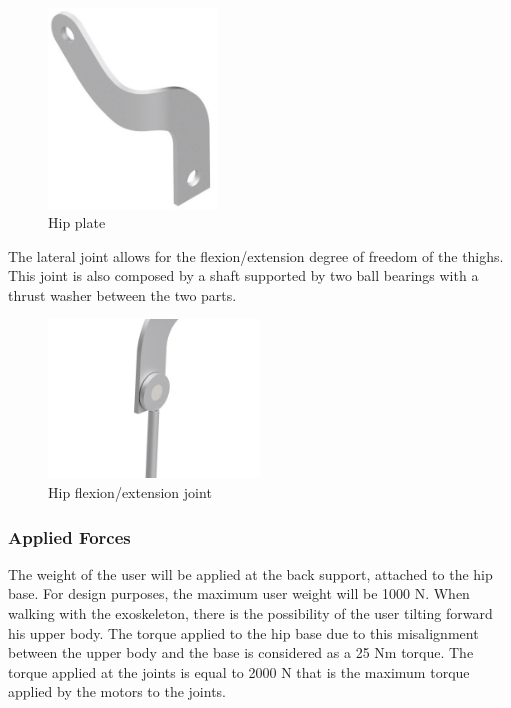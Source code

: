 \begin{figure}[thpb]
      \centering
      \includegraphics[width=0.4\textwidth]{Images/Chapa_quadril.jpg}
      \caption{Hip plate}
      \label{Chapa Quadril}
   \end{figure}
   
   The lateral joint allows for the flexion/extension degree of freedom of the thighs. This joint is also composed by a shaft supported by two ball bearings with a thrust washer between the two parts.
   
   \begin{figure}[thpb]
      \centering
      \includegraphics[width=0.5\textwidth]{Images/Junta_Quadril_2.jpg}
      \caption{Hip flexion/extension joint}
      \label{Junta Quadril 2}
   \end{figure}
   
   \subsubsection{Applied Forces}
   
   The weight of the user will be applied at the back support, attached to the hip base. For design purposes, the maximum user weight will be 1000 N. When walking with the exoskeleton, there is the possibility of the user tilting forward his upper body. The torque applied to the hip base due to this misalignment between the upper body and the base is considered as a 25 Nm torque. The torque applied at the joints is equal to 2000 N that is the maximum torque applied by the motors to the joints.
   
